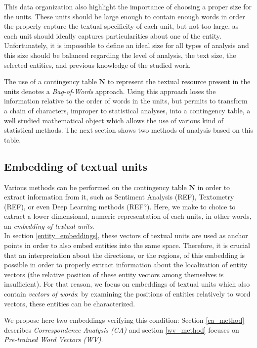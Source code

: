 \documentclass[
twocolumn,
]{ceurart}
\begin{document}
This data organization also highlight the importance of choosing a proper size for the units. These units should be large enough to contain enough words in order the properly capture the textual specificity of each unit, but not too large, as each unit should ideally captures particularities about one of the entity. Unfortunately, it is impossible to define an ideal size for all types of analysis and this size should be balanced regarding the level of analysis, the text size, the selected entities, and previous knowledge of the studied work.

The use of a contingency table $\mathbf{N}$ to represent the textual resource present in the units denotes a \emph{Bag-of-Words} approach. Using this approach loses the information relative to the order of words in the units, but permits to transform a chain of characters, improper to statistical analyses, into a contingency table, a well studied mathematical object which allows the use of various kind of statistical methods. The next section shows two methods of analysis based on this table.

\subsection{Embedding of textual units}
\label{unit_embeddings}

Various methods can be performed on the contingency table $\mathbf{N}$ in order to extract information from it, such as Sentiment Analysis (REF), Textometry (REF), or even Deep Learning methods (REF?). Here, we make to choice to extract a lower dimensional, numeric representation of each units, in other words, an \emph{embedding of textual units}. \\
In section \ref{entity_embeddings}, these vectors of textual units are used as anchor points in order to also embed entities into the same space. Therefore, it is crucial that an interpretation about the directions, or the regions, of this embedding is possible in order to properly extract information about the localization of entity vectors (the relative position of these entity vectors among themselves is insufficient). For that reason, we focus on embeddings of textual units which also contain \emph{vectors of words}: by examining the positions of entities relatively to word vectors, these entities can be characterized.

We propose here two embeddings verifying this condition: Section \ref{ca_method} describes \emph{Correspondence Analysis (CA)} and section \ref{wv_method} focuses on \emph{Pre-trained Word Vectors (WV)}. 
\end{document}
